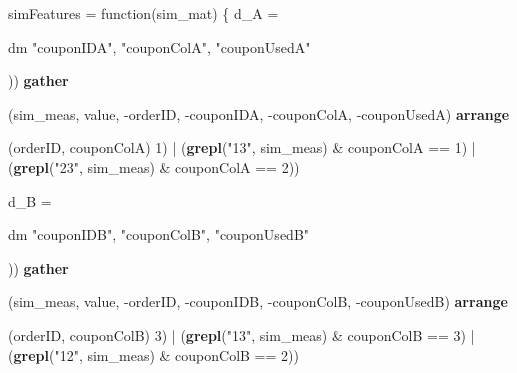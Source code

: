 \documentclass[10pt]{report}
\newenvironment{Shaded}{}{}
\newcommand{\KeywordTok}[1]{\textcolor[rgb]{0.00,0.44,0.13}{\textbf{{#1}}}}
\newcommand{\DataTypeTok}[1]{\textcolor[rgb]{0.56,0.13,0.00}{{#1}}}
\newcommand{\DecValTok}[1]{\textcolor[rgb]{0.25,0.63,0.44}{{#1}}}
\newcommand{\StringTok}[1]{\textcolor[rgb]{0.25,0.44,0.63}{{#1}}}
\newcommand{\NormalTok}[1]{{#1}}
\begin{document}
\begin{Shaded}
\begin{Highlighting}[]
\NormalTok{simFeatures =}\StringTok{ }\NormalTok{function(sim_mat) \{}
    \NormalTok{d_A =}\StringTok{ }\NormalTok{dm %>%}\StringTok{ }\KeywordTok{select}\NormalTok{(orderID, couponID, couponCol, couponUsed) %>%}\StringTok{ }\KeywordTok{renm}\NormalTok{(}\KeywordTok{c}\NormalTok{(}\StringTok{"orderID"}\NormalTok{, }
        \StringTok{"couponIDA"}\NormalTok{, }\StringTok{"couponColA"}\NormalTok{, }\StringTok{"couponUsedA"}\NormalTok{)) %>%}\StringTok{ }\KeywordTok{left_join}\NormalTok{(sim_mat, }\DataTypeTok{by =} \StringTok{"orderID"}\NormalTok{) %>%}\StringTok{ }
\StringTok{        }\KeywordTok{gather}\NormalTok{(sim_meas, value, -orderID, -couponIDA, -couponColA, -couponUsedA) %>%}\StringTok{ }
\StringTok{        }\KeywordTok{arrange}\NormalTok{(orderID, couponColA) %>%}\StringTok{ }\KeywordTok{filter}\NormalTok{((}\KeywordTok{grepl}\NormalTok{(}\StringTok{"12"}\NormalTok{, sim_meas) &}\StringTok{ }\NormalTok{couponColA ==}\StringTok{ }
\StringTok{        }\DecValTok{1}\NormalTok{) |}\StringTok{ }\NormalTok{(}\KeywordTok{grepl}\NormalTok{(}\StringTok{"13"}\NormalTok{, sim_meas) &}\StringTok{ }\NormalTok{couponColA ==}\StringTok{ }\DecValTok{1}\NormalTok{) |}\StringTok{ }\NormalTok{(}\KeywordTok{grepl}\NormalTok{(}\StringTok{"23"}\NormalTok{, sim_meas) &}\StringTok{ }
\StringTok{        }\NormalTok{couponColA ==}\StringTok{ }\DecValTok{2}\NormalTok{))}
    
    \NormalTok{d_B =}\StringTok{ }\NormalTok{dm %>%}\StringTok{ }\KeywordTok{select}\NormalTok{(orderID, couponID, couponCol, couponUsed) %>%}\StringTok{ }\KeywordTok{renm}\NormalTok{(}\KeywordTok{c}\NormalTok{(}\StringTok{"orderID"}\NormalTok{, }
        \StringTok{"couponIDB"}\NormalTok{, }\StringTok{"couponColB"}\NormalTok{, }\StringTok{"couponUsedB"}\NormalTok{)) %>%}\StringTok{ }\KeywordTok{left_join}\NormalTok{(sim_mat, }\DataTypeTok{by =} \StringTok{"orderID"}\NormalTok{) %>%}\StringTok{ }
\StringTok{        }\KeywordTok{gather}\NormalTok{(sim_meas, value, -orderID, -couponIDB, -couponColB, -couponUsedB) %>%}\StringTok{ }
\StringTok{        }\KeywordTok{arrange}\NormalTok{(orderID, couponColB) %>%}\StringTok{ }\KeywordTok{filter}\NormalTok{((}\KeywordTok{grepl}\NormalTok{(}\StringTok{"23"}\NormalTok{, sim_meas) &}\StringTok{ }\NormalTok{couponColB ==}\StringTok{ }
\StringTok{        }\DecValTok{3}\NormalTok{) |}\StringTok{ }\NormalTok{(}\KeywordTok{grepl}\NormalTok{(}\StringTok{"13"}\NormalTok{, sim_meas) &}\StringTok{ }\NormalTok{couponColB ==}\StringTok{ }\DecValTok{3}\NormalTok{) |}\StringTok{ }\NormalTok{(}\KeywordTok{grepl}\NormalTok{(}\StringTok{"12"}\NormalTok{, sim_meas) &}\StringTok{ }
\StringTok{        }\NormalTok{couponColB ==}\StringTok{ }\DecValTok{2}\NormalTok{))}
    
}}}}}}}}
\end{Highlighting}
\end{Shaded}
\end{document}

